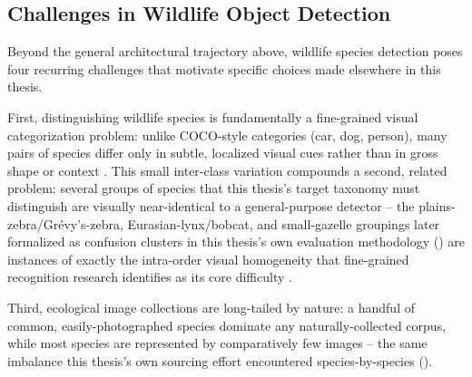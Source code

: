 \subsection{Challenges in Wildlife Object Detection}\label{sec:lit_wildlife_challenges}

Beyond the general architectural trajectory above, wildlife species detection poses four recurring challenges that motivate specific choices made elsewhere in this thesis.

First, distinguishing wildlife species is fundamentally a fine-grained visual categorization problem: unlike COCO-style categories (car, dog, person), many pairs of species differ only in subtle, localized visual cues rather than in gross shape or context \cite{weiFineGrainedImageAnalysis2022}. This small inter-class variation compounds a second, related problem: several groups of species that this thesis's target taxonomy must distinguish are visually near-identical to a general-purpose detector -- the plains-zebra/Grévy's-zebra, Eurasian-lynx/bobcat, and small-gazelle groupings later formalized as confusion clusters in this thesis's own evaluation methodology () are instances of exactly the intra-order visual homogeneity that fine-grained recognition research identifies as its core difficulty \cite{weiFineGrainedImageAnalysis2022}.

Third, ecological image collections are long-tailed by nature: a handful of common, easily-photographed species dominate any naturally-collected corpus, while most species are represented by comparatively few images \cite{cuiClassBalancedLossBased2019,zhangDeepLongTailedLearning2023} -- the same imbalance this thesis's own sourcing effort encountered species-by-species ().

